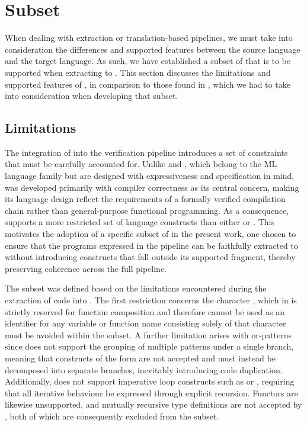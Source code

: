 \section{\whyml Subset}
\label{sec:Whyml_Subset}

When dealing with extraction or translation-based pipelines, we must take into consideration the differences and supported features between the source language and the target language. 
As such, we have established a subset of \whyml that is to be supported when extracting to \cml. This section discusses the limitations and supported features of \cml, in comparison 
to those found in \whyml, which we had to take into consideration when developing that subset.

\subsection{Limitations}

The integration of \cml into the verification pipeline introduces a set of constraints that must be carefully accounted for. Unlike \ocaml and \whyml, 
which belong to the ML language family but are designed with expressiveness and specification in mind, \cml was developed primarily with compiler correctness 
as its central concern, making its language design reflect the requirements of a formally verified compilation chain rather than general-purpose functional programming.
As a consequence, \cml supports a more restricted set of language constructs than either \ocaml or \whyml. This motivates the adoption 
of a specific subset of \whyml in the present work, one chosen to ensure that the programs expressed in the pipeline can be faithfully extracted to \cml 
without introducing constructs that fall outside its supported fragment, thereby preserving coherence across the full pipeline.

The subset was defined based on the limitations encountered during the extraction of \whyml code into \cml. The first restriction concerns the character 
, which in \cml is strictly reserved for function composition and therefore cannot be used as an identifier for any variable or function name consisting 
solely of that character must be avoided within the subset. A further limitation arises with or-patterns since \cml does not support the grouping of multiple patterns under a 
single branch, meaning that constructs of the form  are not accepted and must instead be decomposed into separate branches, inevitably 
introducing code duplication. Additionally, \cml does not support imperative loop constructs such as  or , requiring that all iterative 
behaviour be expressed through explicit recursion. Functors are likewise unsupported, and mutually recursive type definitions are not accepted by \cml, both of which are 
consequently excluded from the subset.

